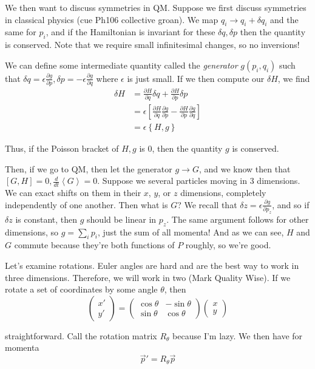 \documentclass[10pt]{report}
\newcommand{\rd}[2]{\frac{d#1}{d#2}}
\newcommand{\pd}[2]{\frac{\partial #1}{\partial#2}}
\newcommand{\expvalue}[1]{\left<#1\right>}
\begin{document}
We then want to discuss symmetries in QM. Suppose we first discuss symmetries in classical physics (cue Ph106 collective groan). We map $q_i \to q_i + \delta q_i$ and the same for $p_i$, and if the Hamiltonian is invariant for these $\delta q,\delta p$ then the quantity is conserved. Note that we require small infinitesimal changes, so no inversions!

We can define some intermediate quantity called the \emph{generator} $g(p_i, q_i)$ such that $\delta q = \epsilon \pd{g}{p}, \delta p = -\epsilon \pd{g}{q}$ where $\epsilon$ is just small. If we then compute our $\delta H$, we find
\begin{align}
	\delta H &= \pd{H}{q}\delta q + \pd{H}{p} \delta p\\
	&= \epsilon \left[\pd{H}{q}\pd{g}{p} - \pd{H}{p}\pd{g}{q}\right]\\
	&= \epsilon \left\{ H,g \right\}
\end{align}

Thus, if the Poisson bracket of $H,g$ is $0$, then the quantity $g$ is conserved.

Then, if we go to QM, then let the generator $g \to G$, and we know then that $\left[ G,H \right] = 0, \rd{}{t}\expvalue{G} = 0$. Suppose we several particles moving in 3 dimensions. We can exact shifts on them in their $x$, $y$, or $z$ dimensions, completely independently of one another. Then what is $G$? We recall that $\delta z = \epsilon \pd{g}{p_z}$, and so if $\delta z$ is constant, then $g$ should be linear in $p_z$. The same argument follows for other dimensions, so $g = \sum_i p_i$, just the sum of all momenta! And as we can see, $H$ and $G$ commute because they're both functions of $P$ roughly, so we're good.

Let's examine rotations. Euler angles are hard and are the best way to work in three dimensions. Therefore, we will work in two (Mark Quality Wise). If we rotate a set of coordinates by some angle $\theta$, then
$$\begin{pmatrix}x' \\ y'\end{pmatrix} = \begin{pmatrix}\cos \theta & -\sin \theta \\ \sin \theta & \cos \theta\end{pmatrix}\begin{pmatrix} x\\y\end{pmatrix}$$

straightforward. Call the rotation matrix $R_\theta$ because I'm lazy. We then have for momenta
$$\vec{p}' = R_\theta \vec{p}$$
\end{document}
